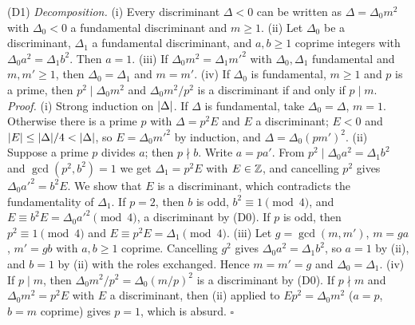 \label{fact:ef-D1}(D1) \emph{Decomposition.}
(i) Every discriminant $\Delta<0$ can be written as $\Delta=\Delta_0m^2$ with $\Delta_0<0$ a fundamental discriminant and $m\ge1$.
(ii) Let $\Delta_0$ be a discriminant, $\Delta_1$ a fundamental discriminant, and $a,b\ge1$ coprime integers with $\Delta_0a^2=\Delta_1b^2$. Then $a=1$.
(iii) If $\Delta_0m^2=\Delta_1m'^2$ with $\Delta_0,\Delta_1$ fundamental and $m,m'\ge1$, then $\Delta_0=\Delta_1$ and $m=m'$.
(iv) If $\Delta_0$ is fundamental, $m\ge1$ and $p$ is a prime, then $p^2\mid\Delta_0m^2$ and $\Delta_0m^2/p^2$ is a discriminant if and only if $p\mid m$.
\emph{Proof.} (i) Strong induction on $\lvert\Delta\rvert$. If $\Delta$ is fundamental, take $\Delta_0=\Delta$, $m=1$. Otherwise there is a prime $p$ with
$\Delta=p^2E$ and $E$ a discriminant; $E<0$ and $\lvert E\rvert\le\lvert\Delta\rvert/4<\lvert\Delta\rvert$, so $E=\Delta_0m'^2$ by induction, and $\Delta=\Delta_0(pm')^2$.
(ii) Suppose a prime $p$ divides $a$; then $p\nmid b$. Write $a=pa'$. From $p^2\mid\Delta_0a^2=\Delta_1b^2$ and $\gcd(p^2,b^2)=1$ we get $\Delta_1=p^2E$
with $E\in\mathbb{Z}$, and cancelling $p^2$ gives $\Delta_0a'^2=b^2E$. We show that $E$ is a discriminant, which contradicts the fundamentality of
$\Delta_1$. If $p=2$, then $b$ is odd, $b^2\equiv1\pmod4$, and $E\equiv b^2E=\Delta_0a'^2\pmod4$, a discriminant by (D0). If $p$ is odd, then
$p^2\equiv1\pmod4$ and $E\equiv p^2E=\Delta_1\pmod4$. (iii) Let $g=\gcd(m,m')$, $m=ga$, $m'=gb$ with $a,b\ge1$ coprime. Cancelling $g^2$ gives
$\Delta_0a^2=\Delta_1b^2$, so $a=1$ by (ii), and $b=1$ by (ii) with the roles exchanged. Hence $m=m'=g$ and $\Delta_0=\Delta_1$.
(iv) If $p\mid m$, then $\Delta_0m^2/p^2=\Delta_0(m/p)^2$ is a discriminant by (D0). If $p\nmid m$ and $\Delta_0m^2=p^2E$ with $E$ a discriminant,
then (ii) applied to $Ep^2=\Delta_0m^2$ ($a=p$, $b=m$ coprime) gives $p=1$, which is absurd. $\square$

